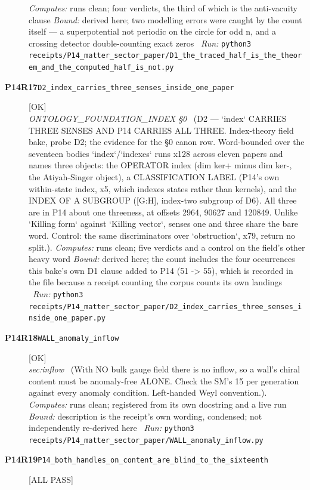 \begin{description}
\emph{Computes:} runs clean; four verdicts, the third of which is the anti-vacuity clause
 \emph{Bound:} derived here; two modelling errors were caught by the count itself --- a superpotential not periodic on the circle for odd n, and a crossing detector double-counting exact zeros
\ \emph{Run:} \texttt{python3 receipts/P14\_matter\_sector\_paper/D1\_the\_traced\_half\_is\_the\_theorem\_and\_the\_computed\_half\_is\_not.py}
\item[\rcptlabel{D2_index_carries_three_senses_inside_one_paper}{P14R17}\textbf{P14R17}\quad\texttt{D2\_index\_carries\_three\_senses\_inside\_one\_paper}]\hfill\textsf{[OK]}\\
\textit{ONTOLOGY\_FOUNDATION\_INDEX \S{}0} \ (D2 --- `index` CARRIES THREE SENSES AND P14 CARRIES ALL THREE. Index-theory field bake, probe D2; the evidence for the \S{}0 canon row. Word-bounded over the seventeen bodies `index`/`indexes` runs x128 across eleven papers and names three objects: the OPERATOR index (dim ker+ minus dim ker-, the Atiyah-Singer object), a CLASSIFICATION LABEL (P14's own within-state index, x5, which indexes states rather than kernels), and the INDEX OF A SUBGROUP ([G:H], index-two subgroup of D6). All three are in P14 about one threeness, at offsets 2964, 90627 and 120849. Unlike `Killing form` against `Killing vector`, senses one and three share the bare word. Control: the same discriminators over `obstruction`, x79, return no split.). 
\emph{Computes:} runs clean; five verdicts and a control on the field's other heavy word
 \emph{Bound:} derived here; the count includes the four occurrences this bake's own D1 clause added to P14 (51 -> 55), which is recorded in the file because a receipt counting the corpus counts its own landings
\ \emph{Run:} \texttt{python3 receipts/P14\_matter\_sector\_paper/D2\_index\_carries\_three\_senses\_inside\_one\_paper.py}
\item[\rcptlabel{WALL_anomaly_inflow}{P14R18}\textbf{P14R18}\quad\texttt{WALL\_anomaly\_inflow}]\hfill\textsf{[OK]}\\
\textit{sec:inflow} \ (With NO bulk gauge field there is no inflow, so a wall's chiral content must be anomaly-free ALONE. Check the SM's 15 per generation against every anomaly condition. Left-handed Weyl convention.). 
\emph{Computes:} runs clean; registered from its own docstring and a live run
 \emph{Bound:} description is the receipt's own wording, condensed; not independently re-derived here
\ \emph{Run:} \texttt{python3 receipts/P14\_matter\_sector\_paper/WALL\_anomaly\_inflow.py}
\item[\rcptlabel{P14_both_handles_on_content_are_blind_to_the_sixteenth}{P14R19}\textbf{P14R19}\quad\texttt{P14\_both\_handles\_on\_content\_are\_blind\_to\_the\_sixteenth}]\hfill\textsf{[ALL PASS]}\\

\end{description}
